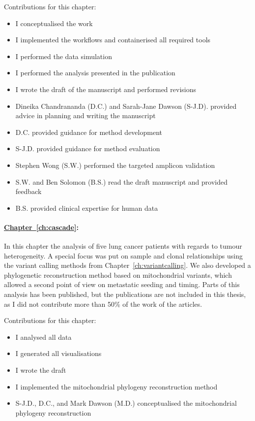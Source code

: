 {Contributions for this chapter:
\begin{itemize}
	\item I conceptualised the work
	\item I implemented the workflows and containerised all required tools
	\item I performed the data simulation
	\item I performed the analysis presented in the publication
	
	\item I wrote the draft of the manuscript and performed revisions
	\item Dineika Chandrananda (D.C.) and Sarah-Jane Dawson (S-J.D). provided advice in planning and writing the manuscript
	\item D.C. provided guidance for method development
	\item S-J.D. provided guidance for method evaluation
	\item Stephen Wong (S.W.) performed the targeted amplicon validation
	\item S.W. and  Ben Solomon (B.S.) read the draft manuscript and provided feedback
	\item B.S. provided clinical expertise for human data
	
\end{itemize}



\paragraph*{\hyperref[ch:cascade]{Chapter~\ref*{ch:cascade}}:} 
In this chapter the analysis of five lung cancer patients with regards to tumour heterogeneity. A special focus was put on sample and clonal relationships using the variant calling methods from Chapter~\ref*{ch:variantcalling}. We also developed a phylogenetic reconstruction method based on mitochondrial variants, which allowed a second point of view on metastatic seeding and timing. Parts of this analysis has been published, but the publications are not included in this thesis, as I did not contribute more than 50\% of the work of the articles. 


Contributions for this chapter:
\begin{itemize}
	\item I analysed all data
	\item I generated all visualisations
	\item I wrote the draft
	\item I implemented the mitochondrial phylogeny reconstruction method
	\item S-J.D., D.C., and Mark Dawson (M.D.) conceptualised the mitochondrial phylogeny reconstruction
	

\end{itemize}}
